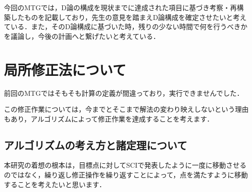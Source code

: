 \documentclass[16.7pt]{jsarticle}
\begin{document}
		
	\articleSPRobj
		今回のMTGでは，D論の構成を現状までに達成された項目に基づき考察・再構築したものを記載しており，先生の意見を踏まえD論構成を確定させたいと考えている．また，そのD論構成に基づいた時，残りの少ない時間で何を行うべきかを議論し，今後の計画へと繋げたいと考えている．
		

	\articleSPRitemsone
		
		\tableofcontents
		
		
	\articleSPRitemstwo
	\renewcommand{\labelitemi}{$\blacktriangledown$}
	\newcommand{\argmax}{\mathop{\rm arg~max}\limits}
	\newcommand{\argmin}{\mathop{\rm arg~min}\limits}
	\newcommand{\Ker}{{\rm Ker}}
	\newcommand{\rank}{{\rm rank}}
	\section{局所修正法について}
		前回のMTGではそもそも計算の定義が間違っており，実行できませんでした．
		
		この修正作業については，今までとそこまで解法の変わり映えしないという理由もあり，アルゴリズムによって修正作業を達成することを考えます．
		
		\subsection{アルゴリズムの考え方と諸定理について}
			本研究の着想の根本は，目標点に対してSCIで発表したように一度に移動させるのではなく，繰り返し修正操作を繰り返すことによって，点を満たすように移動することを考えたいと思います．
		
\end{document}
